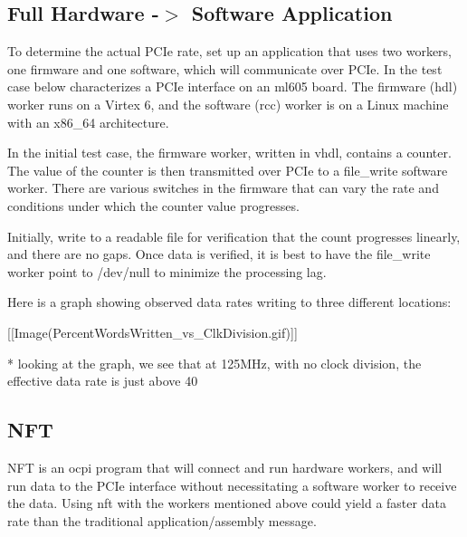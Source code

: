 \subsection{Full Hardware -$>$ Software Application}

To determine the actual PCIe rate, set up an application that uses two workers, one firmware and one software, which will communicate over PCIe.  In the test case below characterizes a PCIe interface on an ml605 board.  The firmware (hdl) worker runs on a Virtex 6, and the software (rcc) worker is on a Linux machine with an x86\_64 architecture.

In the initial test case, the firmware worker, written in vhdl, contains a counter.  The value of the counter is then transmitted over PCIe to a file\_write software worker.  There are various switches in the firmware that can vary the rate and conditions under which the counter value progresses.


Initially, write to a readable file for verification that the count progresses linearly, and there are no gaps.  Once data is verified, it is best to have the file\_write worker point to /dev/null to minimize the processing lag.

Here is a graph showing observed data rates writing to three different locations:


[[Image(PercentWordsWritten\_vs\_ClkDivision.gif)]]


* looking at the graph, we see that at 125MHz, with no clock division, the effective data rate is just above 40%

\subsection{NFT}

NFT is an ocpi program that will connect and run hardware workers, and will run data to the PCIe interface without necessitating a software worker to receive the data.  Using nft with the workers mentioned above could yield a faster data rate than the traditional application/assembly message.
